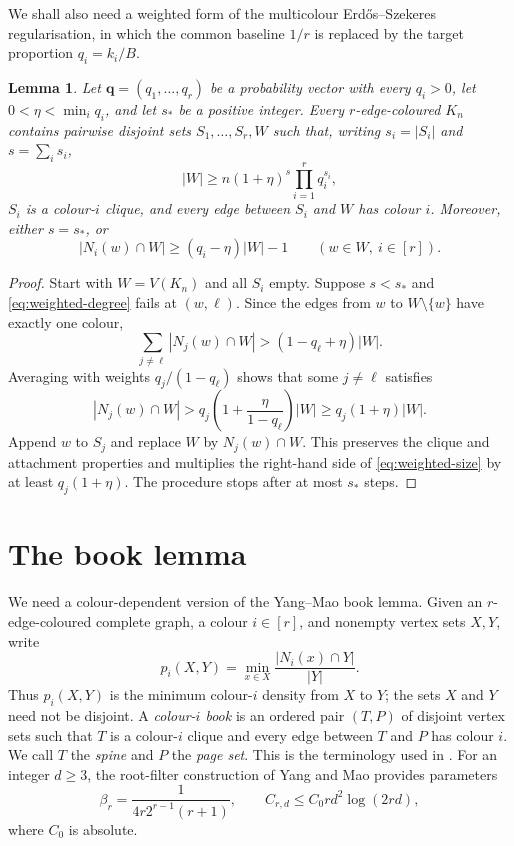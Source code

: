 \documentclass[11pt]{article}
\newtheorem{lemma}[theorem]{Lemma}
\theoremstyle{definition}
\newcommand{\qq}{\mathbf q}
\begin{document}
We shall also need a weighted form of the multicolour Erd\H{o}s--Szekeres
regularisation, in which the common baseline $1/r$ is replaced by the target
proportion $q_i=k_i/B$.

\begin{lemma}\label{lem:weighted}
Let $\qq=(q_1,\ldots,q_r)$ be a probability vector with every $q_i>0$, let
$0<\eta<\min_iq_i$, and let $s_\ast$ be a positive integer.  Every
$r$-edge-coloured $K_n$ contains pairwise disjoint sets
$S_1,\ldots,S_r,W$ such that, writing $s_i=|S_i|$ and $s=\sum_i s_i$,
\begin{equation}\label{eq:weighted-size}
 |W|\ge n(1+\eta)^s\prod_{i=1}^r q_i^{s_i},
\end{equation}
$S_i$ is a colour-$i$ clique, and every edge between $S_i$ and $W$ has colour
$i$.  Moreover, either $s=s_\ast$, or
\begin{equation}\label{eq:weighted-degree}
 |N_i(w)\cap W|\ge(q_i-\eta)|W|-1
 \qquad(w\in W,\ i\in[r]).
\end{equation}
\end{lemma}

\begin{proof}
Start with $W=V(K_n)$ and all $S_i$ empty.  Suppose $s<s_\ast$ and
\eqref{eq:weighted-degree} fails at $(w,\ell)$.  Since the edges from $w$ to
$W\setminus\{w\}$ have exactly one colour,
\[
 \sum_{j\ne\ell}|N_j(w)\cap W|>(1-q_\ell+\eta)|W|.
\]
Averaging with weights $q_j/(1-q_\ell)$ shows that some $j\ne\ell$ satisfies
\[
 |N_j(w)\cap W|>
 q_j\left(1+\frac{\eta}{1-q_\ell}\right)|W|
 \ge q_j(1+\eta)|W|.
\]
Append $w$ to $S_j$ and replace $W$ by $N_j(w)\cap W$.  This preserves the
clique and attachment properties and multiplies the right-hand side of
\eqref{eq:weighted-size} by at least $q_j(1+\eta)$.  The procedure stops after
at most $s_\ast$ steps.
\end{proof}

\section{The book lemma}\label{sec:books}
We need a colour-dependent version of the Yang--Mao book lemma.
Given an $r$-edge-coloured complete graph, a colour $i\in[r]$, and nonempty
vertex sets $X,Y$, write
\[
 p_i(X,Y)=\min_{x\in X}\frac{|N_i(x)\cap Y|}{|Y|}.
\]
Thus $p_i(X,Y)$ is the minimum colour-$i$ density from $X$ to $Y$; the sets
$X$ and $Y$ need not be disjoint.  A \emph{colour-$i$ book} is an
ordered pair $(T,P)$ of disjoint vertex sets such that $T$ is a colour-$i$
clique and every edge between $T$ and $P$ has colour $i$.  We call $T$ the
\emph{spine} and $P$ the \emph{page set}.  This is the terminology used in
\cite{BBCGHMST,YangMao}.
For an integer $d\ge3$, the root-filter construction of Yang and Mao
provides parameters
\begin{equation}\label{eq:corr-params}
 \beta_r=\frac1{4r2^{r-1}(r+1)},
 \qquad C_{r,d}\le C_0rd^2\log(2rd),
\end{equation}
where $C_0$ is absolute.
\end{document}
